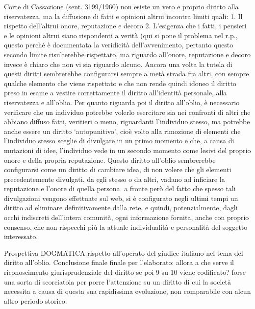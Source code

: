 Corte di Cassazione (sent. 3199/1960) non esiste un vero e proprio diritto alla riservatezza, ma la diffusione di fatti e opinioni altrui incontra limiti quali:
1.	Il rispetto dell’altrui onore, reputazione e decoro
2.	L’esigenza che i fatti, i pensieri e le opinioni altrui siano rispondenti a verità (qui si pone il problema nel r.p., questo perché è documentata la veridicità dell’avvenimento, pertanto questo secondo limite risulterebbe rispettato, ma riguardo all’onore, reputazione e decoro invece è chiaro che non vi sia riguardo alcuno. Ancora una volta la tutela di questi diritti sembrerebbe configurarsi sempre a metà strada fra altri, con sempre qualche elemento che viene rispettato e che non rende quindi idoneo il diritto preso in esame a vestire correttamente il diritto all’identità personale, alla riservatezza e all’oblio.
Per quanto riguarda poi il diritto all’oblio, è necessario verificare che un individuo potrebbe volerlo esercitare sia nei confronti di altri che abbiano diffuso fatti, veritieri o meno, riguardanti l’individuo stesso, ma potrebbe anche essere un diritto ‘autopunitivo’, cioè volto alla rimozione di elementi che l’individuo stesso sceglie di divulgare in un primo momento e che, a causa di mutazioni di idee, l’individuo vede in un secondo momento come lesivi del proprio onore e della propria reputazione.
Questo diritto all’oblio sembrerebbe configurarsi come un diritto di cambiare idea, di non volere che  gli elementi precedentemente divulgati, da egli stesso o da altri, vadano ad inficiare la reputazione e l’onore di quella persona. a fronte però del fatto che spesso tali divulgazioni vengono effettuate sul web, si è configurato negli ultimi tempi un diritto ad eliminare definitivamente dalla rete, e quindi, potenzialmente, dagli occhi indiscreti dell’intera comunità, ogni informazione fornita, anche con proprio consenso, che non rispecchi più la attuale individualità e personalità del soggetto interessato. 

Prospettiva DOGMATICA rispetto all’operato del giudice italiano nel tema del diritto all’oblio.
Conclusione finale finale per l'elaborato: 
allora a che serve il riconoscimento giurisprudenziale del diritto se poi 9 su 10 viene codificato? forse una sorta di scorciatoia per porre l'attenzione su un diritto di cui  la società necessita a causa di questa sua rapidissima evoluzione, non  comparabile con alcun altro periodo storico.


